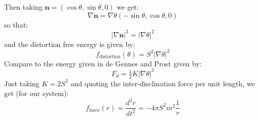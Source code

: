 \documentclass[reqno]{article}
\begin{document}
Then taking $\mathbf{n} = \left(\cos\theta, \sin\theta, 0\right)$ we get:
\begin{equation}
    \nabla \mathbf{n}
    =
    \nabla \theta \left(-\sin\theta, \cos\theta, 0 \right)
\end{equation}
so that:
\begin{equation}
    \left| \nabla\mathbf{n}\right|^2
    =
    \left| \nabla \theta \right|^2
\end{equation}
and the distortion free energy is given by:
\begin{equation}
    f_\text{distortion}(\theta)
    =
    S^2 \left| \nabla \theta \right|^2
\end{equation}
Compare to the energy given in de Gennes and Prost given by:
\begin{equation}
    F_d = \tfrac12 K \left| \nabla \theta \right|^2
\end{equation}
Just taking $K = 2 S^2$ and quoting the inter-disclination force per unit length, we get (for our system):
\begin{equation}
    f_\text{force}(r)
    =
    \frac{d^2 r}{d t^2}
    =
    - 4 \pi S^2 m^2 \frac{1}{r}
\end{equation}
\end{document}
